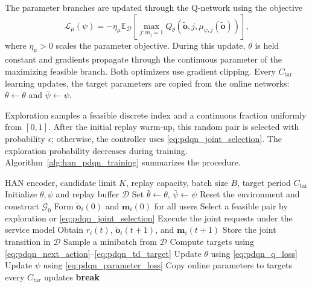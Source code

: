 \documentclass[journal]{IEEEtran}
\begin{document}
The parameter branches are updated through the Q-network
using the objective
\begin{equation}
\mathcal{L}_{\mu}(\psi)
=
-\eta_{\mu}
\mathbb{E}_{\mathcal{D}}
\left[
\max_{j:m_j=1}
Q_\theta\left(
\widetilde{\mathbf{o}},j,
\mu_{\psi,j}(\widetilde{\mathbf{o}})
\right)
\right],
\label{eq:pdqn_parameter_loss}
\end{equation}
where $\eta_{\mu}>0$ scales the parameter objective.
During this update, $\theta$ is held constant and
gradients propagate through the continuous parameter
of the maximizing feasible branch.
Both optimizers use gradient clipping.
Every $C_{\mathrm{tar}}$ learning updates, the target
parameters are copied from the online networks:
$\bar{\theta}\leftarrow\theta$ and
$\bar{\psi}\leftarrow\psi$.

Exploration samples a feasible discrete index and a
continuous fraction uniformly from $[0,1]$.
After the initial replay warm-up, this random pair is
selected with probability $\epsilon$; otherwise, the
controller uses \eqref{eq:pdqn_joint_selection}.
The exploration probability decreases during training.
Algorithm~\ref{alg:han_pdqn_training} summarizes the procedure.

\begin{algorithm}[t]
\caption{HGHO Training}
\label{alg:han_pdqn_training}
\begin{algorithmic}[1]
\Require HAN encoder, candidate limit $K$, replay capacity,
batch size $B$, target period $C_{\mathrm{tar}}$
\State Initialize $\theta,\psi$ and replay buffer $\mathcal{D}$
\State Set $\bar{\theta}\gets\theta$, $\bar{\psi}\gets\psi$
    \State Reset the environment and construct $\mathcal{G}_0$
    \State Form $\widetilde{\mathbf{o}}_i(0)$ and
    $\mathbf{m}_i(0)$ for all users
            \State Select a feasible pair by exploration or
            \eqref{eq:pdqn_joint_selection}
        \EndFor
        \State Execute the joint requests under the service model
        \State Obtain $r_i(t)$, $\widetilde{\mathbf{o}}_i(t+1)$,
        and $\mathbf{m}_i(t+1)$
        \State Store the joint transition in $\mathcal{D}$
            \State Sample a minibatch from $\mathcal{D}$
            \State Compute targets using
            \eqref{eq:pdqn_next_action}--\eqref{eq:pdqn_td_target}
            \State Update $\theta$ using \eqref{eq:pdqn_q_loss}
            \State Update $\psi$ using \eqref{eq:pdqn_parameter_loss}
            \State Copy online parameters to targets every
            $C_{\mathrm{tar}}$ updates
        \EndIf
            \State \textbf{break}
        \EndIf
    \EndFor
\EndFor
\end{algorithmic}
\end{algorithm}
\end{document}
